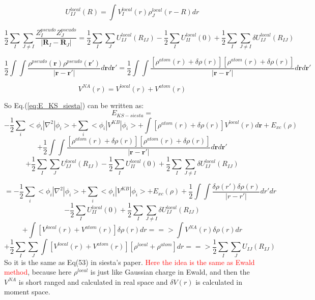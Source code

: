 \documentclass[aps,preprint,12pt]{revtex4-1}
\begin{document}
\begin{equation}
U_{IJ}^{local}(R)=\int{ V_I^{local}(r) {\rho}_J^{local}(r-R)} dr 
\end{equation}

\begin{equation}
\dfrac{1}{2}\sum_{I}\sum_{J\neq I}{\dfrac{Z^{pseudo}_{I} Z^{pseudo}_{J}}{|\mathbf{R}_{I}-\mathbf{R}_{J} |} }=\dfrac{1}{2}\sum_{I}\sum_{J}U_{IJ}^{local}(R_{IJ})-\dfrac{1}{2}\sum_{I}U_{II}^{local}(0) + \dfrac{1}{2}\sum_{I}\sum_{J\neq I} \delta U_{IJ}^{local}(R_{IJ})
\end{equation}


\begin{equation}
\dfrac{1}{2}\int \int {\dfrac{\rho^{pseudo}(\mathbf{r}) \rho^{pseudo}(\mathbf{r'}) }{|\mathbf{r}-\mathbf{r'} |}  
d\mathbf{r}  d\mathbf{r'} } =  \dfrac{1}{2}\int \int {\dfrac{ [\rho^{atom}(r)+\delta\rho(r) ] [\rho^{atom}(r)+\delta\rho(r) ] }{|\mathbf{r}-\mathbf{r'} |}  
d\mathbf{r}  d\mathbf{r'} }  
\end{equation}

\begin{equation}
V^{NA}(r)=V^{local}(r)+V^{atom}(r)
\end{equation}

So Eq.(\ref{eq:E_KS_siesta}) can be written as:
\[
E_{KS-siesta}=
\]
\[
-\dfrac{1}{2}\sum_{i}<\phi_i|\nabla^2|\phi_i> +\sum_{i}<\phi_i|V^{KB}|\phi_i>+
\int{[\rho^{atom}(r)+\delta\rho(r) ] V^{local}(r)  d\mathbf{r}}+E_{xc}(\rho)
\]
\[
+\dfrac{1}{2}\int \int {\dfrac{ [\rho^{atom}(r)+\delta\rho(r) ] [\rho^{atom}(r)+\delta\rho(r) ] }{|\mathbf{r}-\mathbf{r'} |}  
d\mathbf{r}  d\mathbf{r'} }  
\]
\[
+\dfrac{1}{2}\sum_{I}\sum_{J}U_{IJ}^{local}(R_{IJ})-\dfrac{1}{2}\sum_{I}U_{II}^{local}(0) + \dfrac{1}{2}\sum_{I}\sum_{J\neq I} \delta U_{IJ}^{local}(R_{IJ})
\]

\[
= -\dfrac{1}{2}\sum_{i}<\phi_i|\nabla^2|\phi_i> +\sum_{i}<\phi_i|V^{KB}|\phi_i>
+E_{xc}(\rho)+\dfrac{1}{2}\int\int {\dfrac{ \delta \rho(r') \delta \rho(r)}{|r-r'|} dr' dr} 
\]
\[
-\dfrac{1}{2}\sum_{I}U_{II}^{local}(0) + \dfrac{1}{2}\sum_{I}\sum_{J\neq I} \delta U_{IJ}^{local}(R_{IJ})
\] 
\[
+\int{[V^{local}(r)+V^{atom}(r)]\delta \rho(r) dr   } ==> \int{V^{NA}(r)\delta \rho(r) dr   }
\]
\begin{equation}
+\dfrac{1}{2}\sum_{I}\sum_{J}\int{[V^{local}(r)+V^{atom}(r)][\rho^{local}+\rho^{atom} ] dr   }==>  \dfrac{1}{2}\sum_{I}\sum_{J} U_{IJ}(R_{IJ})
\label{eq:E_KS_siesta_my}
\end{equation}
So it is the same as Eq(53) in siesta's paper. 
\textcolor{red}{Here the idea is the same as Ewald method}, because here $\rho^{local}$ is just like Gaussian charge in Ewald, and
then the $V^{NA}$ is short ranged and calculated in real space and  $\delta V(r)$  is calculated in moment space.   
\end{document}

